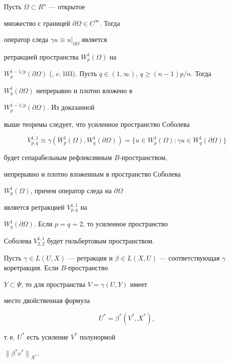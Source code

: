 \begin{examnonum}


Пусть $\Omega \subset R^n$ --- открытое


множество с границей $\partial\Omega \in C^{\infty}$. Тогда


оператор следа $\gamma u \equiv u|_{\partial\Omega}$ является


ретракцией пространства $W^1_p(\Omega)$ на


$W_p^{1-1/p}(\partial\Omega)$ (\cite{Necas}, c.\,103). Пусть $q \in (1,


\infty)$, $q \geq (n-1)p/n$. Тогда


$W_q^1(\partial\Omega)$ непрерывно и плотно вложено в


$W_p^{1-1/p}(\partial\Omega)$. Из доказанной


выше теоремы следует, что усиленное пространство Соболева


$$


V_{p, q}^{1, 1} \equiv \gamma(W_p^1(\Omega),


W_q^1(\partial\Omega)) =


\{u \in W_p^1(\Omega): \gamma u \in W_q^1(\partial\Omega) \}


$$


будет сепарабельным рефлексивным $B$-пространством,


непрерывно и плотно вложенным в пространство Соболева


$W_p^1(\Omega)$, причем оператор следа на $\partial\Omega$


является ретракцией $V_{p, q}^{1, 1}$ на


$W_q^1(\partial\Omega)$. Если $p=q=2$, то усиленное пространство


Соболева $V_{2, 2}^{1, 1}$ будет гильбертовым пространством.


\end{examnonum}





\begin{thms}


Пусть $\gamma \in L(U,X)$ --- ретракция и $\beta \in L(X,


U)$ --- соответствующая $\gamma$ коретракция. Если $B$-пространство


$Y \subset \Psi$, то для пространства $V=\gamma(U,Y)$ имеет


место двойственная формула


$$


U^*=\beta^*(V^*, X^*),


$$


т.\,е. $U^*$ есть усиление $V^*$ полунормой


${\|\beta^*v^*\|}_{X^*}$.


\end{thms}





